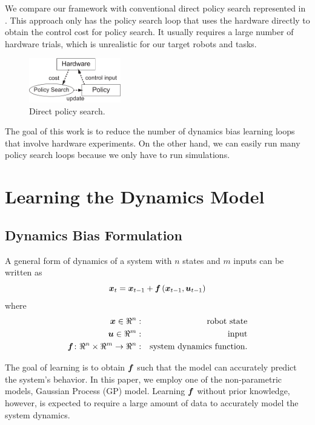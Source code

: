 \documentclass[letterpaper, 10 pt, conference]{ieeeconf}
\begin{document}
We compare our framework with conventional direct policy search
represented in .
This approach only has the policy search loop that uses the hardware
directly to obtain the control cost for policy search.
It usually requires a large number of hardware trials, which
is unrealistic for our target robots and tasks.

\begin{figure}[tb]
\begin{center}
\includegraphics[width=40mm]{eps/direct_policy_search.pdf}
\caption{Direct policy search.}
\label{fig:learning_direct-policy-search}
\end{center}
\end{figure}

The goal of this work is to reduce the number of dynamics bias
learning loops that involve hardware experiments.
On the other hand, we can easily run many policy search loops because
we only have to run simulations.


\section{Learning the Dynamics Model} \label{sec:learning_model-learning}

\subsection{Dynamics Bias Formulation}

A general form of dynamics of a system with $n$ states and $m$ inputs
can be written as 
\begin{equation}
\mbox{\boldmath \(x\)}_t = \mbox{\boldmath \(x\)}_{t-1} + \mbox{\boldmath \(f\)}\left(\mbox{\boldmath \(x\)}_{t-1},
\mbox{\boldmath \(u\)}_{t-1}\right)
\end{equation}
where
\begin{eqnarray*}
\mbox{\boldmath \(x\)}\in \Re^{n} &: & \mbox{robot state}\\
\mbox{\boldmath \(u\)}\in \Re^{m} &: & \mbox{input}\\
\mbox{\boldmath \(f\)}\colon \Re^{n}\times\Re^{m}\rightarrow \Re^{n} &: & \mbox{system dynamics function}.
\end{eqnarray*}

The goal of learning is to obtain $\mbox{\boldmath \(f\)}$ such
that the model can accurately predict the system's behavior.
In this paper, we employ one of the non-parametric models, Gaussian
Process (GP) model.
Learning $\mbox{\boldmath \(f\)}$ without prior knowledge, however, is expected to
require a large amount of data to accurately model the system dynamics.
\end{document}
